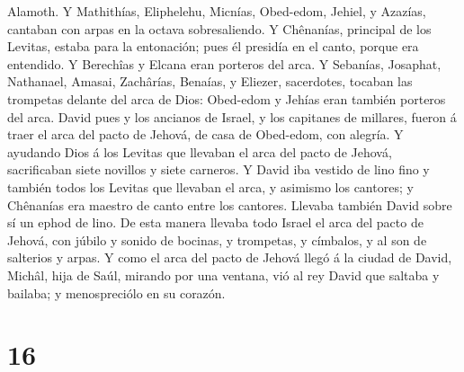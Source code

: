 Alamoth.  Y Mathithías, Eliphelehu, Micnías, Obed-edom,
Jehiel, y Azazías, cantaban con arpas en la octava sobresaliendo.
 Y Chênanías, principal de los Levitas, estaba para la
entonación; pues él presidía en el canto, porque era entendido.
 Y Berechîas y Elcana eran porteros del arca. 
Y Sebanías, Josaphat, Nathanael, Amasai, Zachârías, Benaías, y Eliezer,
sacerdotes, tocaban las trompetas delante del arca de Dios: Obed-edom y
Jehías eran también porteros del arca.  David pues y los
ancianos de Israel, y los capitanes de millares, fueron á traer el arca
del pacto de Jehová, de casa de Obed-edom, con alegría.  Y
ayudando Dios á los Levitas que llevaban el arca del pacto de Jehová,
sacrificaban siete novillos y siete carneros.  Y David iba
vestido de lino fino y también todos los Levitas que llevaban el arca, y
asimismo los cantores; y Chênanías era maestro de canto entre los
cantores. Llevaba también David sobre sí un ephod de lino. 
De esta manera llevaba todo Israel el arca del pacto de Jehová, con
júbilo y sonido de bocinas, y trompetas, y címbalos, y al son de
salterios y arpas.  Y como el arca del pacto de Jehová
llegó á la ciudad de David, Michâl, hija de Saúl, mirando por una
ventana, vió al rey David que saltaba y bailaba; y menospreciólo en su
corazón.

\hypertarget{section-15}{%
\section{16}\label{section-15}}

